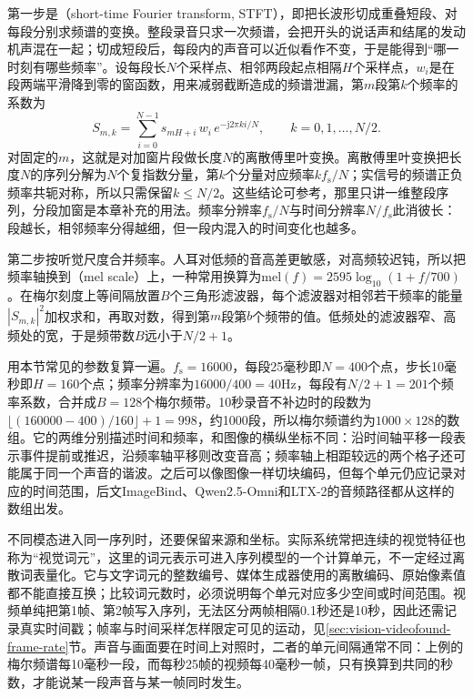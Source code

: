 第一步是（short-time Fourier transform, STFT），即把长波形切成重叠短段、对每段分别求频谱的变换。整段录音只求一次频谱，会把开头的说话声和结尾的发动机声混在一起；切成短段后，每段内的声音可以近似看作不变，于是能得到“哪一时刻有哪些频率”。设每段长$N$个采样点、相邻两段起点相隔$H$个采样点，$w_i$是在段两端平滑降到零的窗函数，用来减弱截断造成的频谱泄漏，第$m$段第$k$个频率的系数为
\begin{equation}
  S_{m,k}=\sum_{i=0}^{N-1} s_{mH+i}\,w_i\,
          e^{-\mathrm{j}2\pi ki/N},
  \qquad k=0,1,\ldots,N/2.
  \label{eq:vision-models-stft}
\end{equation}
对固定的$m$，这就是对加窗片段做长度$N$的离散傅里叶变换。离散傅里叶变换把长度$N$的序列分解为$N$个复指数分量，第$k$个分量对应频率$kf_{\mathrm s}/N$；实信号的频谱正负频率共轭对称，所以只需保留$k\leq N/2$。这些结论可参考，那里只讲一维整段序列，分段加窗是本章补充的用法。频率分辨率$f_{\mathrm s}/N$与时间分辨率$N/f_{\mathrm s}$此消彼长：段越长，相邻频率分得越细，但一段内混入的时间变化也越多。

第二步按听觉尺度合并频率。人耳对低频的音高差更敏感，对高频较迟钝，所以把频率轴换到（mel scale）上，一种常用换算为$\mathrm{mel}(f)=2595\log_{10}(1+f/700)$。在梅尔刻度上等间隔放置$B$个三角形滤波器，每个滤波器对相邻若干频率的能量$|S_{m,k}|^2$加权求和，再取对数，得到第$m$段第$b$个频带的值。低频处的滤波器窄、高频处的宽，于是频带数$B$远小于$N/2+1$。

用本节常见的参数复算一遍。$f_{\mathrm s}=16000$，每段25毫秒即$N=400$个点，步长10毫秒即$H=160$个点；频率分辨率为$16000/400=40$Hz，每段有$N/2+1=201$个频率系数，合并成$B=128$个梅尔频带。10秒录音不补边时的段数为$\lfloor(160000-400)/160\rfloor+1=998$，约1000段，所以梅尔频谱约为$1000\times128$的数组。它的两维分别描述时间和频率，和图像的横纵坐标不同：沿时间轴平移一段表示事件提前或推迟，沿频率轴平移则改变音高；频率轴上相距较远的两个格子还可能属于同一个声音的谐波。之后可以像图像一样切块编码，但每个单元仍应记录对应的时间范围，后文ImageBind、Qwen2.5-Omni和LTX-2的音频路径都从这样的数组出发。

不同模态进入同一序列时，还要保留来源和坐标。实际系统常把连续的视觉特征也称为“视觉词元”，这里的词元表示可进入序列模型的一个计算单元，不一定经过离散词表量化。它与文字词元的整数编号、媒体生成器使用的离散编码、原始像素值都不能直接互换；比较词元数时，必须说明每个单元对应多少空间或时间范围。视频单纯把第1帧、第2帧写入序列，无法区分两帧相隔0.1秒还是10秒，因此还需记录真实时间戳；帧率与时间采样怎样限定可见的运动，见\ref{sec:vision-videofound-frame-rate}节。声音与画面要在时间上对照时，二者的单元间隔通常不同：上例的梅尔频谱每10毫秒一段，而每秒25帧的视频每40毫秒一帧，只有换算到共同的秒数，才能说某一段声音与某一帧同时发生。

